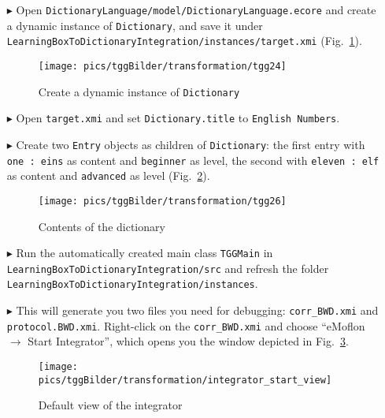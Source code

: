 \begin{enumerate}
\item[$\blacktriangleright$] Open \texttt{Dictionary\-Language/model/Dictionary\-Language.ecore} and create a dynamic instance of \texttt{Dictionary}, and save it under \texttt{Learn\-ing\-Box\-To\-Dictionary\-In\-te\-gra\-tion/in\-stan\-ces/target.xmi} (Fig.~\ref{fig:create_instance_dict}).

\begin{figure}[htbp]
\begin{center}
  \texttt{[image: pics/tggBilder/transformation/tgg24]}
  \caption{Create a dynamic instance of \texttt{Dictionary}}
  \label{fig:create_instance_dict}
\end{center}
\end{figure}

\item[$\blacktriangleright$] Open \texttt{target.xmi} and set \texttt{Dictionary.title} to \texttt{English Numbers}.
\item[$\blacktriangleright$] Create two \texttt{Entry} objects as children of \texttt{Dictionary}: the first entry with \texttt{one : eins} as content and \texttt{beginner} as level, the second with \texttt{eleven : elf} as content and \texttt{advanced} as level (Fig.~\ref{fig:dictionaryxmi}).

\begin{figure}[htbp]
\begin{center}
  \texttt{[image: pics/tggBilder/transformation/tgg26]}
  \caption{Contents of the dictionary}
  \label{fig:dictionaryxmi}
\end{center}
\end{figure}

\item[$\blacktriangleright$] Run the automatically created main class \texttt{TGGMain} in \texttt{LearningBox\-To\-Dictionary\-In\-te\-gra\-tion\-/src} and refresh the folder \texttt{LearningBox\-To\-Dictionary\-In\-te\-gra\-tion/\-instances}.
\item[$\blacktriangleright$] This will generate you two files you need for debugging: \texttt{corr\_BWD.xmi} and \texttt{protocol.BWD.xmi}.
Right-click on the \texttt{corr\_BWD.xmi} and choose ``eMoflon $\rightarrow$ Start Integrator'', which opens you the window depicted in Fig.~\ref{fig:integrator_start}.

\begin{figure}[htbp]
\begin{center}
  \texttt{[image: pics/tggBilder/transformation/integrator\_start\_view]}
  \caption{Default view of the integrator}
  \label{fig:integrator_start}
\end{center}
\end{figure}


\end{enumerate}
